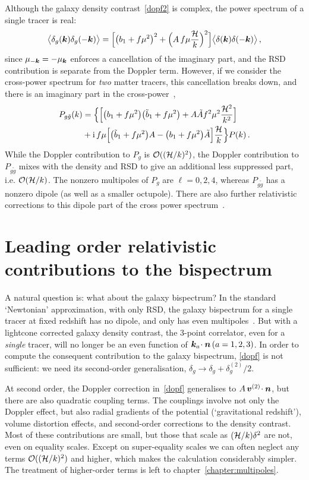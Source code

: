 Although the galaxy density contrast~\eqref{dopf2} is complex, the power spectrum of a single tracer is real:
\begin{equation}
\big\langle \delta_g(\bm {k})\delta_g(-\bm {k})\big\rangle
=\Big[ \big(b_{1} + f\mu^{2}\big)^2+\Big(A\,f \mu \frac{\mathcal{H}}{k}\Big)^2\Big] \big\langle \delta(\bm {k})\delta(-\bm {k})\big\rangle \,,\nonumber
\end{equation}
since $\mu_{-\bm {k}}=-\mu_{\bm {k}}$ enforces a cancellation of the imaginary part, and the RSD contribution is separate from the Doppler term.
However, if we consider the cross-power spectrum for {\em two} matter tracers, this cancellation breaks down, and  there is an imaginary part in the cross-power~\citep{McDonald:2009dh,Bonvin:2014owa},
\begin{align}
P_{g \tilde g}(k)&= \Big\{\Big[ \big(b_{1} + f\mu^{2}\big)\big(\tilde b_{1} + f\mu^{2}\big)+A\tilde A f^2\mu^2 {\frac{\mathcal{H}^2}{k^2}}\Big]\nonumber\\
&
+\mathrm{i\,} f\mu\Big[\big(\tilde b_{1} + f\mu^{2}\big)A-\big(b_{1} + f\mu^{2}\big)\tilde A\Big]{\frac{\mathcal{H}}{k}} \Big\}P(k) \,.\nonumber
\end{align}
While the Doppler contribution to $P_g$ is $\mathcal{O}((\mathcal{H}/k)^{2})$,  the Doppler contribution to $P_{g\tilde g}$ mixes with the density and RSD to give an additional less suppressed part, i.e. $\mathcal{O}(\mathcal{H}/k)$. The nonzero multipoles of $P_g$ are $\ell=0,2,4$, whereas  $P_{g \tilde g}$ has a nonzero dipole (as well as a smaller octupole).  There are also further relativistic corrections to this dipole part of the cross power spectrum~\citep{DiDio:2018zmk}.


\section{Leading order relativistic contributions to the bispectrum}

A natural question is: what about the galaxy bispectrum? In the standard `Newtonian' approximation, with only RSD, the galaxy bispectrum for a single tracer at fixed redshift has no dipole, and only has even multipoles~\citep{Scoccimarro:1999ed,Nan:2017oaq}. But with a lightcone corrected galaxy density contrast, the 3-point correlator, even for a {\em single} tracer, will no longer be an even function of $\bm {k}_a\!\cdot\bm {n} \,(a=1,2,3)$. In order to compute the consequent contribution to the galaxy bispectrum, \eqref{dopf} is not sufficient: we need its second-order generalisation, $\delta_g \to \delta_g+\delta^{(2)}_g/2$.

At second order, the Doppler correction in~\eqref{dopf} generalises to $A\, \bm{v}^{(2)}\!\cdot\bm {n}$, but there are also quadratic coupling terms. The couplings involve not only the Doppler effect, but also radial gradients of the potential (`gravitational redshift'), volume distortion effects, and second-order corrections to the density contrast. Most of these contributions are small, but those that scale as $(\mathcal{H}/k)\delta^2$ are not, even on equality scales. Except on super-equality scales we can often neglect any terms $\mathcal{O}((\mathcal{H}/k)^{2})$ and higher, which makes the calculation considerably simpler. The treatment of higher-order terms is left to chapter~\ref{chapter:multipoles}.

